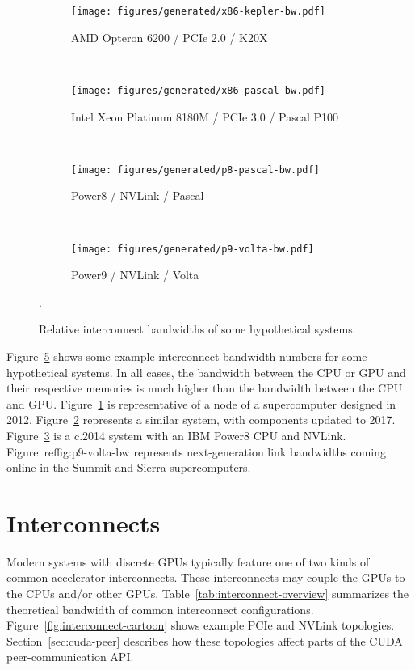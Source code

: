 \begin{figure}[ht]
    \centering
    \begin{subfigure}[b]{0.2\textwidth}
        \texttt{[image: figures/generated/x86-kepler-bw.pdf]}
        \caption{AMD Opteron 6200 / PCIe 2.0 / K20X }
        \label{fig:x86-kepler-bw}
    \end{subfigure}
	~
	\begin{subfigure}[b]{0.2\textwidth}
        \texttt{[image: figures/generated/x86-pascal-bw.pdf]}
        \caption{Intel Xeon Platinum 8180M / PCIe 3.0 / Pascal P100}
        \label{fig:x86-pascal-bw}
    \end{subfigure}
    ~
    \begin{subfigure}[b]{0.2\textwidth}
        \texttt{[image: figures/generated/p8-pascal-bw.pdf]}
        \caption{Power8 / NVLink / Pascal}
        \label{fig:p8-pascal-bw}
    \end{subfigure}
    ~
    \begin{subfigure}[b]{0.2\textwidth}
        \texttt{[image: figures/generated/p9-volta-bw.pdf]}
        \caption{Power9 / NVLink / Volta}
        \label{fig:p9-pascal-bw}
    \end{subfigure}
    \caption[]{Relative interconnect bandwidths of some hypothetical systems. \cite{amd2012opteron6200} \cite{stuechli2013power8}}.
    \label{fig:gpu-sys-arch}
\end{figure}

Figure~\ref{fig:gpu-sys-arch} shows some example interconnect bandwidth numbers for some hypothetical systems.
In all cases, the bandwidth between the CPU or GPU and their respective memories is much higher than the bandwidth between the CPU and GPU.
Figure~\ref{fig:x86-kepler-bw} is representative of a node of a supercomputer designed in 2012.
Figure~\ref{fig:x86-pascal-bw} represents a similar system, with components updated to 2017.
Figure~\ref{fig:p8-pascal-bw} is a c.2014 system with an IBM Power8 CPU and NVLink.
Figure~ref{fig:p9-volta-bw} represents next-generation link bandwidths coming online in the Summit and Sierra supercomputers.

\section{Interconnects}
\label{sec:interconnects}

Modern systems with discrete GPUs typically feature one of two kinds of common accelerator interconnects.
These interconnects may couple the GPUs to the CPUs and/or other GPUs.
Table~\ref{tab:interconnect-overview} summarizes the theoretical bandwidth of common interconnect configurations.
Figure~\ref{fig:interconnect-cartoon} shows example PCIe and NVLink topologies.
Section~\ref{sec:cuda-peer} describes how these topologies affect parts of the CUDA peer-communication API.

